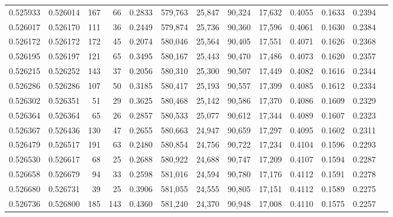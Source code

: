 \begin{tabular}{rrrrrrrrrrrrr}
0.525933 & 0.526014 &   167 &    66 &                                     0.2833 & 579,763 &  25,847 &  90,324 &  17,632 & 0.4055 & 0.1633 & 0.2394 \\
0.526017 & 0.526170 &   111 &    36 &                                     0.2449 & 579,874 &  25,736 &  90,360 &  17,596 & 0.4061 & 0.1630 & 0.2384 \\
0.526172 & 0.526172 &   172 &    45 &                                     0.2074 & 580,046 &  25,564 &  90,405 &  17,551 & 0.4071 & 0.1626 & 0.2368 \\
0.526195 & 0.526197 &   121 &    65 &                                     0.3495 & 580,167 &  25,443 &  90,470 &  17,486 & 0.4073 & 0.1620 & 0.2357 \\
0.526215 & 0.526252 &   143 &    37 &                                     0.2056 & 580,310 &  25,300 &  90,507 &  17,449 & 0.4082 & 0.1616 & 0.2344 \\
0.526286 & 0.526286 &   107 &    50 &                                     0.3185 & 580,417 &  25,193 &  90,557 &  17,399 & 0.4085 & 0.1612 & 0.2334 \\
0.526302 & 0.526351 &    51 &    29 &                                     0.3625 & 580,468 &  25,142 &  90,586 &  17,370 & 0.4086 & 0.1609 & 0.2329 \\
0.526364 & 0.526364 &    65 &    26 &                                     0.2857 & 580,533 &  25,077 &  90,612 &  17,344 & 0.4089 & 0.1607 & 0.2323 \\
0.526367 & 0.526436 &   130 &    47 &                                     0.2655 & 580,663 &  24,947 &  90,659 &  17,297 & 0.4095 & 0.1602 & 0.2311 \\
0.526479 & 0.526517 &   191 &    63 &                                     0.2480 & 580,854 &  24,756 &  90,722 &  17,234 & 0.4104 & 0.1596 & 0.2293 \\
0.526530 & 0.526617 &    68 &    25 &                                     0.2688 & 580,922 &  24,688 &  90,747 &  17,209 & 0.4107 & 0.1594 & 0.2287 \\
0.526658 & 0.526679 &    94 &    33 &                                     0.2598 & 581,016 &  24,594 &  90,780 &  17,176 & 0.4112 & 0.1591 & 0.2278 \\
0.526680 & 0.526731 &    39 &    25 &                                     0.3906 & 581,055 &  24,555 &  90,805 &  17,151 & 0.4112 & 0.1589 & 0.2275 \\
0.526736 & 0.526800 &   185 &   143 &                                     0.4360 & 581,240 &  24,370 &  90,948 &  17,008 & 0.4110 & 0.1575 & 0.2257 \\

\end{tabular}
